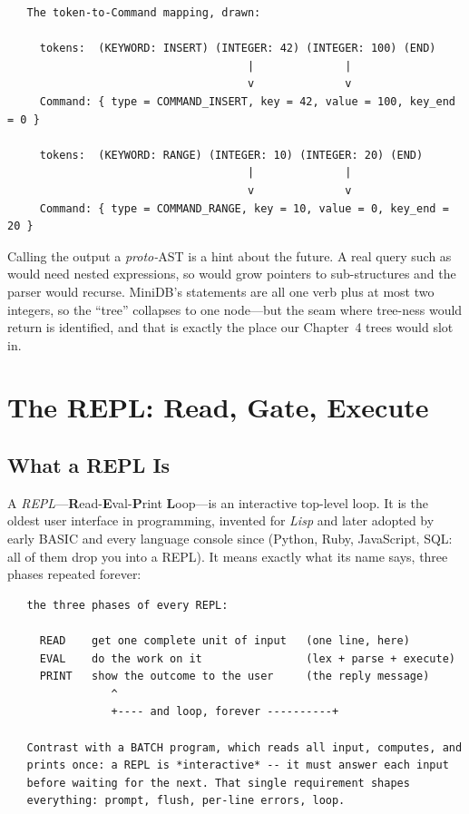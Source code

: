 \begin{verbatim}
   The token-to-Command mapping, drawn:

     tokens:  (KEYWORD: INSERT) (INTEGER: 42) (INTEGER: 100) (END)
                                     |              |
                                     v              v
     Command: { type = COMMAND_INSERT, key = 42, value = 100, key_end = 0 }

     tokens:  (KEYWORD: RANGE) (INTEGER: 10) (INTEGER: 20) (END)
                                     |              |
                                     v              v
     Command: { type = COMMAND_RANGE, key = 10, value = 0, key_end = 20 }
\end{verbatim}

Calling the output a \emph{proto-}AST is a hint about the future. A
real query such as  would
need nested expressions, so  would grow pointers to
sub-structures and the parser would recurse. MiniDB's statements are
all one verb plus at most two integers, so the ``tree'' collapses to
one node---but the seam where tree-ness would return is identified,
and that is exactly the place our Chapter~4 trees would slot in.

\section{The REPL: Read, Gate, Execute}

\subsection{What a REPL Is}

A \emph{REPL}---\textbf{R}ead-\textbf{E}val-\textbf{P}rint
\textbf{L}oop---is an interactive top-level loop. It is the oldest user
interface in programming, invented for \emph{Lisp} and later adopted
by early BASIC and every language console since (Python, Ruby,
JavaScript, SQL: all of them drop you into a REPL). It means exactly
what its name says, three phases repeated forever:

\begin{verbatim}
   the three phases of every REPL:

     READ    get one complete unit of input   (one line, here)
     EVAL    do the work on it                (lex + parse + execute)
     PRINT   show the outcome to the user     (the reply message)
                ^
                +---- and loop, forever ----------+

   Contrast with a BATCH program, which reads all input, computes, and
   prints once: a REPL is *interactive* -- it must answer each input
   before waiting for the next. That single requirement shapes
   everything: prompt, flush, per-line errors, loop.
\end{verbatim}

